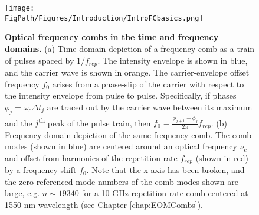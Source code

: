 \begin{figure}[htpb]
	\begin{center}
		\texttt{[image: \\FigPath/Figures/Introduction/IntroFCbasics.png]}
	\end{center}
	\caption[Optical frequency combs in the time and frequency domains]{\textbf{Optical frequency combs in the time and frequency domains.} (a) Time-domain depiction of a frequency comb as a train of pulses spaced by $1/f_{rep}$. The intensity envelope is shown in blue, and the carrier wave is shown in orange. The carrier-envelope offset frequency $f_0$ arises from a phase-slip of the carrier with respect to the intensity envelope from pulse to pulse. Specifically, if phases $\phi_j=\omega_c\Delta t_j$ are traced out by the carrier wave between its maximum and the $j$\textsuperscript{th} peak of the pulse train, then $f_0=\frac{\phi_{j+1}-\phi_j}{2\pi}f_{rep}$. (b) Frequency-domain depiction of the same frequency comb. The comb modes (shown in blue) are centered around an optical frequency $\nu_c$ and offset from harmonics of the repetition rate $f_{rep}$ (shown in red) by a frequency shift $f_0$. Note that the x-axis has been broken, and the zero-referenced mode numbers of the comb modes shown are large, e.g. $n\sim19340$ for a 10 GHz repetition-rate comb centered at 1550 nm wavelength (see Chapter \ref{chap:EOMCombs}). }
	\label{fig:CombBasics}
\end{figure} 

